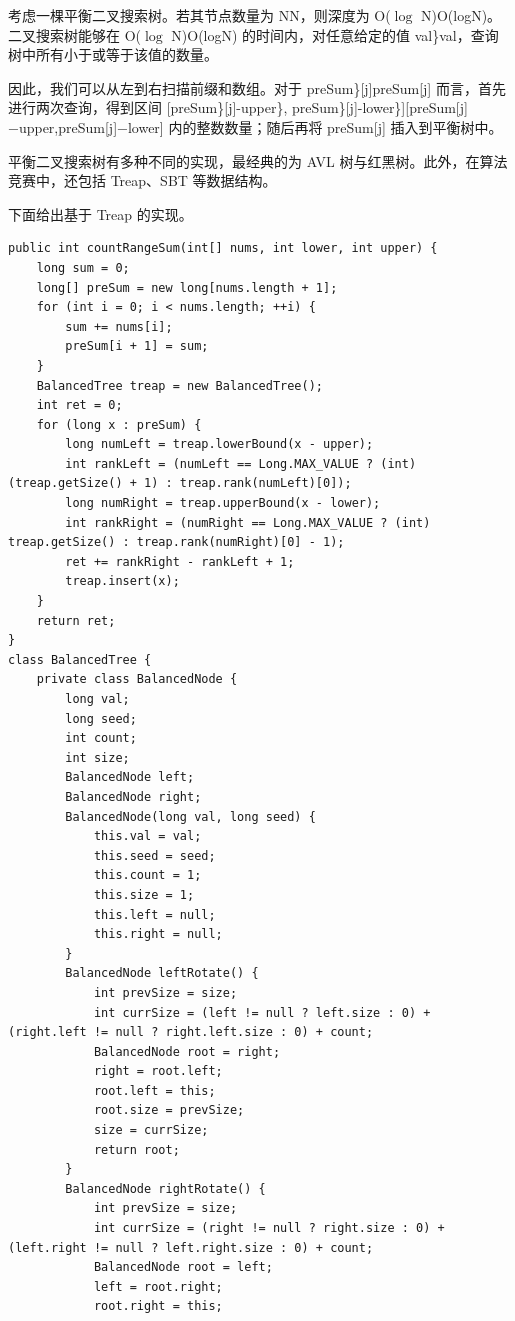 \documentclass[9pt, b5paaper]{book}
\begin{document}
\begin{enumerate}
考虑一棵平衡二叉搜索树。若其节点数量为 NN，则深度为 O($\log$ N)O(logN)。二叉搜索树能够在 O($\log$ N)O(logN) 的时间内，对任意给定的值 val\}val，查询树中所有小于或等于该值的数量。

因此，我们可以从左到右扫描前缀和数组。对于 preSum\}[j]preSum[j] 而言，首先进行两次查询，得到区间 [preSum\}[j]-upper\}, preSum\}[j]-lower\}][preSum[j]−upper,preSum[j]−lower] 内的整数数量；随后再将 preSum[j] 插入到平衡树中。

平衡二叉搜索树有多种不同的实现，最经典的为 AVL 树与红黑树。此外，在算法竞赛中，还包括 Treap、SBT 等数据结构。

下面给出基于 Treap 的实现。

\begin{verbatim}
public int countRangeSum(int[] nums, int lower, int upper) {
    long sum = 0;
    long[] preSum = new long[nums.length + 1];
    for (int i = 0; i < nums.length; ++i) {
        sum += nums[i];
        preSum[i + 1] = sum;
    }
    BalancedTree treap = new BalancedTree();
    int ret = 0;
    for (long x : preSum) {
        long numLeft = treap.lowerBound(x - upper);
        int rankLeft = (numLeft == Long.MAX_VALUE ? (int) (treap.getSize() + 1) : treap.rank(numLeft)[0]);
        long numRight = treap.upperBound(x - lower);
        int rankRight = (numRight == Long.MAX_VALUE ? (int) treap.getSize() : treap.rank(numRight)[0] - 1);
        ret += rankRight - rankLeft + 1;
        treap.insert(x);
    }
    return ret;
}
class BalancedTree {
    private class BalancedNode {
        long val;
        long seed;
        int count;
        int size;
        BalancedNode left;
        BalancedNode right;
        BalancedNode(long val, long seed) {
            this.val = val;
            this.seed = seed;
            this.count = 1;
            this.size = 1;
            this.left = null;
            this.right = null;
        }
        BalancedNode leftRotate() {
            int prevSize = size;
            int currSize = (left != null ? left.size : 0) + (right.left != null ? right.left.size : 0) + count;
            BalancedNode root = right;
            right = root.left;
            root.left = this;
            root.size = prevSize;
            size = currSize;
            return root;
        }
        BalancedNode rightRotate() {
            int prevSize = size;
            int currSize = (right != null ? right.size : 0) + (left.right != null ? left.right.size : 0) + count;
            BalancedNode root = left;
            left = root.right;
            root.right = this;

\end{verbatim}
\end{enumerate}
\end{document}
